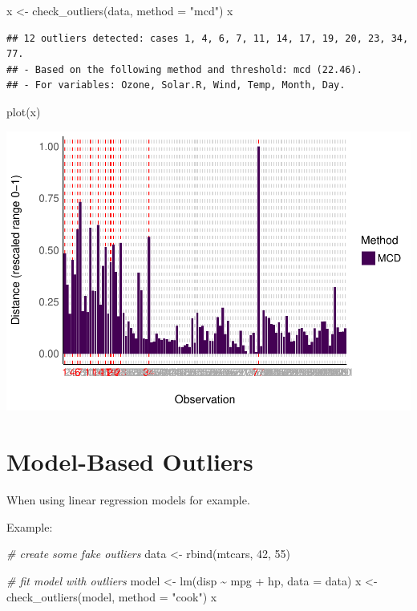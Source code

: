 \documentclass[
]{article}
\newenvironment{Shaded}{\begin{snugshade}}{\end{snugshade}}
\newcommand{\AttributeTok}[1]{\textcolor[rgb]{0.77,0.63,0.00}{#1}}
\newcommand{\CommentTok}[1]{\textcolor[rgb]{0.56,0.35,0.01}{\textit{#1}}}
\newcommand{\DecValTok}[1]{\textcolor[rgb]{0.00,0.00,0.81}{#1}}
\newcommand{\FunctionTok}[1]{\textcolor[rgb]{0.00,0.00,0.00}{#1}}
\newcommand{\NormalTok}[1]{#1}
\newcommand{\OtherTok}[1]{\textcolor[rgb]{0.56,0.35,0.01}{#1}}
\newcommand{\SpecialCharTok}[1]{\textcolor[rgb]{0.00,0.00,0.00}{#1}}
\newcommand{\StringTok}[1]{\textcolor[rgb]{0.31,0.60,0.02}{#1}}
\begin{document}
\begin{Shaded}
\begin{Highlighting}[]
\NormalTok{x }\OtherTok{\textless{}{-}} \FunctionTok{check\_outliers}\NormalTok{(data, }\AttributeTok{method =} \StringTok{"mcd"}\NormalTok{)}
\NormalTok{x}
\end{Highlighting}
\end{Shaded}

\begin{verbatim}
## 12 outliers detected: cases 1, 4, 6, 7, 11, 14, 17, 19, 20, 23, 34, 77.
## - Based on the following method and threshold: mcd (22.46).
## - For variables: Ozone, Solar.R, Wind, Temp, Month, Day.
\end{verbatim}

\begin{Shaded}
\begin{Highlighting}[]
\FunctionTok{plot}\NormalTok{(x)}
\end{Highlighting}
\end{Shaded}

\includegraphics{paper_files/figure-latex/multivarite outliers-1.pdf}

\hypertarget{model-based-outliers}{%
\section{Model-Based Outliers}\label{model-based-outliers}}

When using linear regression models for example.

Example:

\begin{Shaded}
\begin{Highlighting}[]
\CommentTok{\# create some fake outliers}
\NormalTok{data }\OtherTok{\textless{}{-}} \FunctionTok{rbind}\NormalTok{(mtcars, }\DecValTok{42}\NormalTok{, }\DecValTok{55}\NormalTok{)}

\CommentTok{\# fit model with outliers}
\NormalTok{model }\OtherTok{\textless{}{-}} \FunctionTok{lm}\NormalTok{(disp }\SpecialCharTok{\textasciitilde{}}\NormalTok{ mpg }\SpecialCharTok{+}\NormalTok{ hp, }\AttributeTok{data =}\NormalTok{ data)}
\NormalTok{x }\OtherTok{\textless{}{-}} \FunctionTok{check\_outliers}\NormalTok{(model, }\AttributeTok{method =} \StringTok{"cook"}\NormalTok{)}
\NormalTok{x}
\end{Highlighting}
\end{Shaded}
\end{document}
